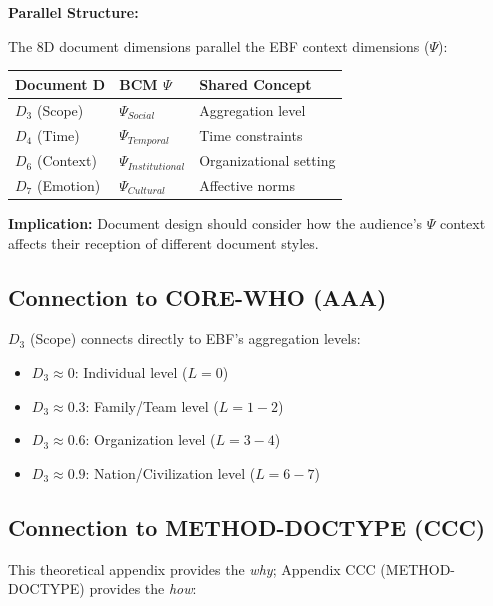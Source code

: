 \begin{tcolorbox}[colback=yellow!5!white, colframe=yellow!75!black,
    title=Integration: REF-DOCTYPE $\leftrightarrow$ CORE-WHEN]

\textbf{Parallel Structure:}

The 8D document dimensions parallel the EBF context dimensions ($\Psi$):

\begin{center}
\begin{tabular}{lll}
\textbf{Document D} & \textbf{BCM $\Psi$} & \textbf{Shared Concept} \\
\midrule
$D_3$ (Scope) & $\Psi_{Social}$ & Aggregation level \\
$D_4$ (Time) & $\Psi_{Temporal}$ & Time constraints \\
$D_6$ (Context) & $\Psi_{Institutional}$ & Organizational setting \\
$D_7$ (Emotion) & $\Psi_{Cultural}$ & Affective norms \\
\end{tabular}
\end{center}

\textbf{Implication:} Document design should consider how the audience's
$\Psi$ context affects their reception of different document styles.

\end{tcolorbox}

\subsection{Connection to CORE-WHO (AAA)}

$D_3$ (Scope) connects directly to EBF's aggregation levels:

\begin{itemize}[nosep]
\item $D_3 \approx 0$: Individual level ($L = 0$)
\item $D_3 \approx 0.3$: Family/Team level ($L = 1-2$)
\item $D_3 \approx 0.6$: Organization level ($L = 3-4$)
\item $D_3 \approx 0.9$: Nation/Civilization level ($L = 6-7$)
\end{itemize}

\subsection{Connection to METHOD-DOCTYPE (CCC)}

This theoretical appendix provides the \textit{why};
Appendix CCC (METHOD-DOCTYPE) provides the \textit{how}:


